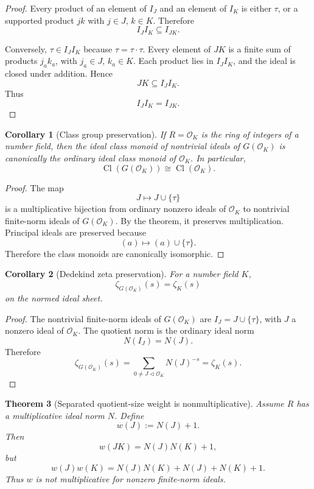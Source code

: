 \documentclass[11pt]{article}
\newtheorem{theorem}{Theorem}[section]
\newtheorem{corollary}[theorem]{Corollary}
\newcommand{\Cl}{\operatorname{Cl}}
\begin{document}
\begin{proof}
Every product of an element of \(I_J\) and an element of \(I_K\) is either \(\tau\), or a supported product \(jk\) with \(j\in J\), \(k\in K\). Therefore
\[
I_JI_K\subseteq I_{JK}.
\]

Conversely, \(\tau\in I_JI_K\) because \(\tau=\tau\cdot\tau\). Every element of \(JK\) is a finite sum of products \(j_ak_a\), with \(j_a\in J\), \(k_a\in K\). Each product lies in \(I_JI_K\), and the ideal is closed under addition. Hence
\[
JK\subseteq I_JI_K.
\]
Thus
\[
I_JI_K=I_{JK}.
\]
\end{proof}

\begin{corollary}[Class group preservation]
If \(R=\mathcal O_K\) is the ring of integers of a number field, then the ideal class monoid of nontrivial ideals of \(G(\mathcal O_K)\) is canonically the ordinary ideal class monoid of \(\mathcal O_K\). In particular,
\[
\Cl(G(\mathcal O_K))\cong\Cl(\mathcal O_K).
\]
\end{corollary}

\begin{proof}
The map
\[
J\longmapsto J\cup\{\tau\}
\]
is a multiplicative bijection from ordinary nonzero ideals of \(\mathcal O_K\) to nontrivial finite-norm ideals of \(G(\mathcal O_K)\). By the theorem, it preserves multiplication. Principal ideals are preserved because
\[
(a)\mapsto(a)\cup\{\tau\}.
\]
Therefore the class monoids are canonically isomorphic.
\end{proof}

\begin{corollary}[Dedekind zeta preservation]
For a number field \(K\),
\[
\zeta_{G(\mathcal O_K)}(s)=\zeta_K(s)
\]
on the normed ideal sheet.
\end{corollary}

\begin{proof}
The nontrivial finite-norm ideals of \(G(\mathcal O_K)\) are \(I_J=J\cup\{\tau\}\), with \(J\) a nonzero ideal of \(\mathcal O_K\). The quotient norm is the ordinary ideal norm
\[
N(I_J)=N(J).
\]
Therefore
\[
\zeta_{G(\mathcal O_K)}(s)
=
\sum_{0\neq J\triangleleft\mathcal O_K}N(J)^{-s}
=
\zeta_K(s).
\]
\end{proof}

\begin{theorem}[Separated quotient-size weight is nonmultiplicative]
Assume \(R\) has a multiplicative ideal norm \(N\). Define
\[
w(J):=N(J)+1.
\]
Then
\[
w(JK)=N(J)N(K)+1,
\]
but
\[
w(J)w(K)=N(J)N(K)+N(J)+N(K)+1.
\]
Thus \(w\) is not multiplicative for nonzero finite-norm ideals.
\end{theorem}
\end{document}
